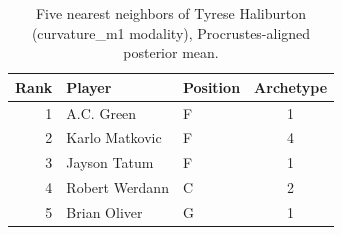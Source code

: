 \begin{table}[htbp]
  \centering\small
  \begin{tabular}{rllc}
    \toprule
    Rank & Player & Position & Archetype \\
    \midrule
    1 & A.C. Green & F & 1 \\
    2 & Karlo Matkovic & F & 4 \\
    3 & Jayson Tatum & F & 1 \\
    4 & Robert Werdann & C & 2 \\
    5 & Brian Oliver & G & 1 \\
    \bottomrule
  \end{tabular}
  \caption{Five nearest neighbors of Tyrese Haliburton (curvature_m1 modality), Procrustes-aligned posterior mean.}
  \label{tab:Tyrese_Haliburton_neighbors_curvature_m1}
\end{table}

